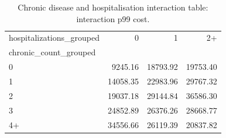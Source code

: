 \begin{table}
\caption{Chronic disease and hospitalisation interaction table: interaction p99 cost.}
\label{tab:02-interaction-p99-cost}
\begin{tabular}{lrrr}
\toprule
hospitalizations_grouped & 0 & 1 & 2+ \\
chronic_count_grouped &  &  &  \\
\midrule
0 & 9245.16 & 18793.92 & 19753.40 \\
1 & 14058.35 & 22983.96 & 29767.32 \\
2 & 19037.18 & 29144.84 & 36586.30 \\
3 & 24852.89 & 26376.26 & 28668.77 \\
4+ & 34556.66 & 26119.39 & 20837.82 \\
\bottomrule
\end{tabular}
\end{table}
